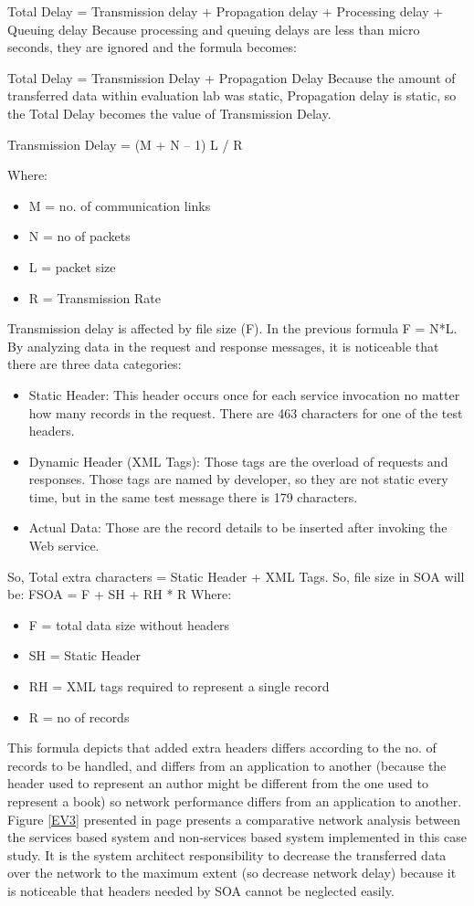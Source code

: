 \documentclass[12pt,a4paper,final,twoside,onecolumn,titlepage]{book}
\begin{document}
Total Delay = Transmission delay + Propagation delay + Processing delay + Queuing delay Because processing and queuing delays are less than micro seconds, they are ignored and the formula becomes:

Total Delay = Transmission Delay + Propagation Delay Because the amount of transferred data within evaluation lab was static, Propagation delay is static, so the Total Delay becomes the value of Transmission Delay.

Transmission Delay = (M + N – 1) L / R

Where:
\begin{itemize}
\item M =  no. of communication links
\item N = no of packets
\item L = packet size
\item R = Transmission Rate
\end{itemize}

Transmission delay is affected by file size (F). In the previous formula F = N*L.
By analyzing data in the request and response messages, it is noticeable that there are three data categories:
\begin{itemize}
\item Static Header: This header occurs once for each service invocation no matter how many records in the request. There are 463 characters for one of the test headers.
\item Dynamic Header (\gls{XML} Tags): Those tags are the overload of requests and responses. Those tags are named by developer, so they are not static every time, but in the same test message there is 179 characters.
\item Actual Data: Those are the record details to be inserted after invoking the Web service.
\end{itemize}

So, Total extra characters = Static Header + \gls{XML} Tags. So, file size in \gls{SOA} will be:
FSOA = F + SH + RH * R
Where:
\begin{itemize}
\item F = total data size without headers
\item SH = Static Header
\item RH = \gls{XML} tags required to represent a single record
\item R = no of records
\end{itemize}
This formula depicts that added extra headers differs according to the no. of records to be handled, and differs from an application to another (because the header used to represent an author might be different from the one used to represent a book) so network performance differs from an application to another. Figure \ref{EV3} presented in page \pageref{EV3} presents a comparative network analysis between the services based system and non-services based system implemented in this case study. It is the system architect responsibility to decrease the transferred data over the network to the maximum extent (so decrease network delay) because it is noticeable that headers needed by \gls{SOA} cannot be neglected easily.
\end{document}
